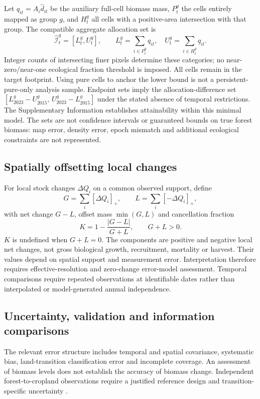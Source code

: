 \documentclass[11pt,a4paper]{article}
\begin{document}
Let $q_{it}=A_i\widehat d_{it}$ be the auxiliary full-cell biomass mass, $P_t^g$ the cells entirely mapped as group $g$, and $H_t^g$ all cells with a positive-area intersection with that group. The compatible aggregate allocation set is
\[
\widehat{\mathcal I}_t^g=[L_t^g,U_t^g],\qquad
L_t^g=\sum_{i\in P_t^g}q_{it},\quad U_t^g=\sum_{i\in H_t^g}q_{it}.
\]
Integer counts of intersecting finer pixels determine these categories; no near-zero/near-one ecological fraction threshold is imposed. All cells remain in the target footprint. Using pure cells to anchor the lower bound is not a persistent-pure-only analysis sample. Endpoint sets imply the allocation-difference set $[L_{2023}^g-U_{2015}^g,\,U_{2023}^g-L_{2015}^g]$ under the stated absence of temporal restrictions. The Supplementary Information establishes attainability within this minimal model. The sets are not confidence intervals or guaranteed bounds on true forest biomass: map error, density error, epoch mismatch and additional ecological constraints are not represented.

\subsection{Spatially offsetting local changes}
For local stock changes $\Delta Q_i$ on a common observed support, define
\[
G=\sum_i[\Delta Q_i]_+,\qquad L=\sum_i[-\Delta Q_i]_+,
\]
with net change $G-L$, offset mass $\min(G,L)$ and cancellation fraction
\begin{equation}
K=1-\frac{|G-L|}{G+L},\qquad G+L>0.\label{eq:cancel}
\end{equation}
$K$ is undefined when $G+L=0$. The components are positive and negative local net changes, not gross biological growth, recruitment, mortality or harvest. Their values depend on spatial support and measurement error. Interpretation therefore requires effective-resolution and zero-change error-model assessment. Temporal comparisons require repeated observations at identifiable dates rather than interpolated or model-generated annual independence.

\subsection{Uncertainty, validation and information comparisons}
The relevant error structure includes temporal and spatial covariance, systematic bias, land-transition classification error and incomplete coverage. An assessment of biomass levels does not establish the accuracy of biomass change. Independent forest-to-cropland observations require a justified reference design and transition-specific uncertainty \citep{Olofsson2014}.
\end{document}
